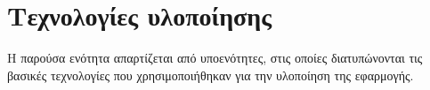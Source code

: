 \section{Τεχνολογίες υλοποίησης}

Η παρούσα ενότητα απαρτίζεται από υποενότητες, στις οποίες διατυπώνονται τις βασικές τεχνολογίες που χρησιμοποιήθηκαν για την υλοποίηση της εφαρμογής.




